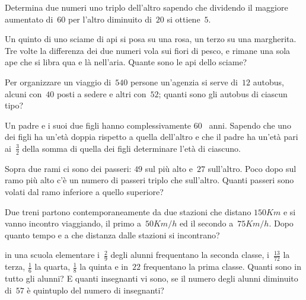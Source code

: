 \begin{multicols}{2}
\begin{esercizio}[\Ast, \croce]
\label{ese:16.91}
Determina due numeri uno triplo dell'altro sapendo che dividendo il maggiore aumentato di~$60$ per l'altro diminuito di~$20$ si ottiene~$5$.
\end{esercizio}

\begin{esercizio}[\Ast, \croce]
\label{ese:16.92}
Un quinto di uno sciame di api si posa su una rosa, un terzo su una margherita. Tre volte la differenza dei due numeri vola sui fiori di pesco, e rimane una sola ape che si libra qua e là nell'aria. Quante sono le api dello sciame?
\end{esercizio}

\begin{esercizio}[\Ast, \croce]
\label{ese:16.93}
Per organizzare un viaggio di~$540$ persone un'agenzia si serve di~$12$ autobus, alcuni con~$40$ posti a sedere e altri con~$52$; quanti sono gli autobus di ciascun tipo?
\end{esercizio}

\begin{esercizio}[\Ast]
\label{ese:16.94}
Un padre e i suoi due figli hanno complessivamente $ 60 $ ~anni. Sapendo che uno dei figli ha un'età doppia rispetto a quella dell'altro e che il padre ha un'età pari ai~$ \frac{3}{2} $ della somma di quella dei figli determinare l'età di ciascuno.
\end{esercizio}

\begin{esercizio}[\Ast]
\label{ese:16.95}
Sopra due rami ci sono dei passeri: $ 49 $ sul più alto e~$ 27 $ sull'altro. Poco dopo sul ramo più alto c'è un numero di passeri triplo che sull'altro. Quanti passeri sono volati dal ramo inferiore a quello superiore?
\end{esercizio}

\begin{esercizio}[\Ast]
\label{ese:16.96}
Due treni partono contemporaneamente da due stazioni che distano $ 150\unit{Km} $ e si vanno incontro viaggiando, il primo a~$ 50\unit{Km/h} $ ed il secondo a~$ 75\unit{Km/h} $. Dopo quanto tempo e a che distanza dalle stazioni si incontrano?
\end{esercizio}

\begin{esercizio}[\Ast]
\label{ese:16.97}
in una scuola elementare i~$ \frac{2}{9} $ degli alunni frequentano la seconda classe, i~$ \frac{13}{72} $ la terza, $ \frac{1}{6} $ la quarta, $\frac{1}{8} $ la quinta e in~$22$ frequentano la prima classe. Quanti sono in tutto gli alunni? E quanti insegnanti vi sono, se il numero degli alunni diminuito di~$57$ è quintuplo del numero di insegnanti?
\end{esercizio}


\end{multicols}
